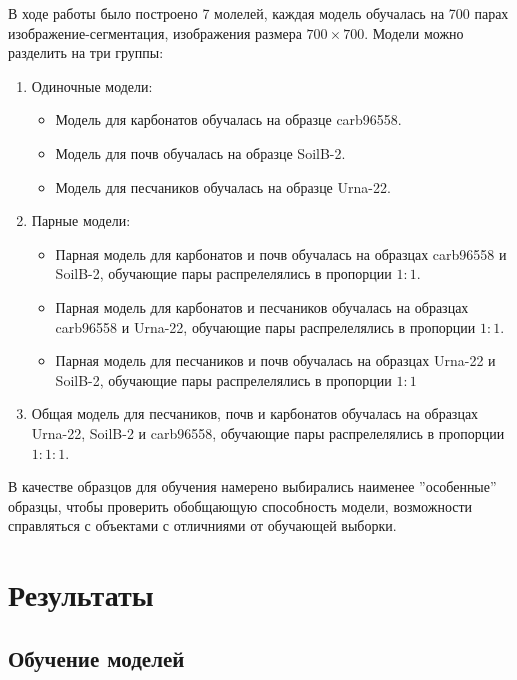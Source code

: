 \documentclass[14pt, a4paper, oneside, bold]{extarticle}
\begin{document}
В ходе работы было построено 7 молелей, каждая модель обучалась на 700 парах изображение-сегментация, изображения размера $700\times700$. Модели можно разделить на три группы:
\begin{enumerate}
	\item Одиночные модели:
	\begin{itemize}
		\item Модель для карбонатов обучалась на образце carb96558.
	
		\item Модель для почв обучалась на образце SoilB-2.
	
		\item Модель для песчаников обучалась на образце Urna-22.
	\end{itemize}
	
	\item Парные модели:
	\begin{itemize}	
		\item Парная модель для карбонатов и почв обучалась на образцах carb96558 и SoilB-2, обучающие пары распрелелялись в пропорции $1:1$.
	
		\item Парная модель для карбонатов и песчаников обучалась на образцах carb96558 и Urna-22, обучающие пары распрелелялись в пропорции $1:1$.
	
	\item  Парная модель для песчаников и почв обучалась на образцах Urna-22 и SoilB-2, обучающие пары распрелелялись в пропорции $1:1$
	\end{itemize}
	
	\item  Общая модель для песчаников, почв и карбонатов обучалась на образцах Urna-22, SoilB-2 и carb96558, обучающие пары распрелелялись в пропорции $1:1:1$.
	
\end{enumerate}

В качестве образцов для обучения намерено выбирались наименее ''особенные'' образцы, чтобы проверить обобщающую способность модели, возможности справляться с объектами с отличниями от обучающей выборки.


\newpage


\section{Результаты} \label{seg_results}

\subsection{Обучение моделей}
\end{document}
